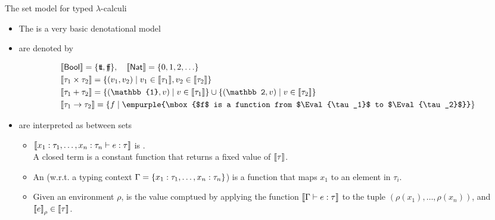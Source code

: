 \documentclass[paper=screen,mode=present,style=zysimple]{powerdot}
\begin{document}
\begin{slide}{The set model for typed $\lambda$-calculi}
\begin{itemize}
\item The  is a very basic denotational model
\item {} are denoted by 
\begin{smalltext}
\[
\begin{array}{l}
\Eval \tbool = \set{\vtt, \vff}, \quad 
\Eval \tnat = \set{0, 1, 2, \ldots } 
\\[0.3em]
\Eval{\tau_1 \times \tau_2} = \set{(v_1, v_2) \mid v_1 \in \Eval{\tau_1}, v_2 \in \Eval{\tau_2}} 
\\[0.3em]
\Eval{\tau_1 + \tau_2} = \set{(\mathbb{1}, v) \mid v \in \Eval{\tau_1}} \cup \set{(\mathbb 2, v) \mid v \in \Eval{\tau_2}} 
\\[0.3em]
\Eval{\tau_1 \to \tau_2} = \set{f \mid \empurple{\mbox{$f$ is a function from $\Eval{\tau_1}$ to $\Eval{\tau_2}$}}}
\end{array}
\]
\end{smalltext}
\vspace*{-1em}
\item {} are interpreted as  between sets
\begin{itemize} \small
\item ${\left\llbracket{x_1: \tau_1, \ldots, x_n: \tau_n \vdash e : \tau}\right\rrbracket}$ is 
  . 
  \\
  A closed term is a constant function that returns a fixed value of ${\left\llbracket{\tau}\right\rrbracket}$.
\item An  (w.r.t. a typing context $\Gamma = \{{x_1 : \tau_1, \ldots, x_n : \tau_n}\}$) 
  is a function that maps $x_1$ to an element in $\tau_i$.
\item Given an environment $\rho$,  is the value comptued by applying the function  
  ${\left\llbracket{\Gamma \vdash e: \tau}\right\rrbracket}$ to the tuple $(\rho(x_1), \ldots, \rho(x_n))$, and ${\left\llbracket{e}\right\rrbracket}_\rho \in {\left\llbracket{\tau}\right\rrbracket}$.
\end{itemize}
\end{itemize}
\end{slide}
\end{document}
